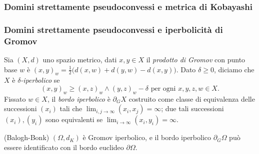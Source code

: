 \begin{frame}
  \frametitle{Domini strettamente pseudoconvessi e metrica di Kobayashi}
\end{frame}

\begin{frame}[t]
  \frametitle{Domini strettamente pseudoconvessi e iperbolicità di Gromov}
  \begin{defn}
    Sia $(X,d)$ uno spazio metrico, dati $x,y \in X$ il \textit{prodotto di Gromov} con punto base $w$ è $(x,y)_w=\frac{1}{2}\big(d(x,w)+d(y,w)-d(x,y)\big)$. Dato $\delta \ge 0$, diciamo che $X$ è \textit{$\delta$-iperbolico} se
  $$(x,y)_w \ge (x,z)_w\wedge(y,z)_w-\delta\text{ per ogni }x,y,z,w \in X.$$
  Fissato $w \in X$, il \textit{bordo iperbolico} è $\partial_GX$ costruito come classe di equivalenza delle successioni $(x_i)$ tali che $\displaystyle\lim_{i,j\rightarrow \infty}(x_i,x_j)=\infty$; due tali successioni $(x_i), (y_i)$ sono equivalenti se $\displaystyle\lim_{i\rightarrow \infty}(x_i,y_i)=\infty$.
  \end{defn}
  \pause
  \begin{thm}
    (Balogh-Bonk) $(\Omega,d_K)$ è Gromov iperbolico, e il bordo iperbolico $\partial_G\Omega$ può essere identificato con il bordo euclideo $\partial\Omega$.
  \end{thm}
\end{frame}
